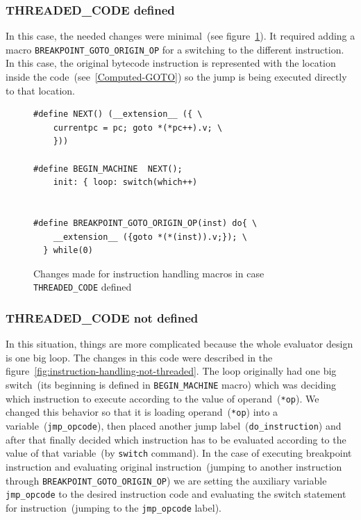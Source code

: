 \documentclass[thesis=M,english]{FITthesis}[2018/10/20]
\newcommand{\code}[1]{\texttt{#1}}
\begin{document}
{\subsubsection{THREADED{\_}CODE defined}

In this case, the needed changes were minimal~(see figure~\ref{fig:instruction-handling-threaded}). It required adding a macro \code{BREAKPOINT{\_}GOTO{\_}ORIGIN{\_}OP} for a switching to the different instruction. In this case, the original bytecode instruction is represented with the location inside the code~(see~\ref{Computed-GOTO}) so the jump is being executed directly to that location.

\begin{figure}[H]
\begin{lstlisting}
#define NEXT() (__extension__ ({ \
    currentpc = pc; goto *(*pc++).v; \
    }))

#define BEGIN_MACHINE  NEXT();
    init: { loop: switch(which++)


#define BREAKPOINT_GOTO_ORIGIN_OP(inst) do{ \
    __extension__ ({goto *(*(inst)).v;}); \
  } while(0)
\end{lstlisting}
	\caption{Changes made for instruction handling macros in case \code{THREADED{\_}CODE} defined}\label{fig:instruction-handling-threaded}
\end{figure}

\subsubsection{THREADED{\_}CODE not defined}

In this situation, things are more complicated because the whole evaluator design is one big loop. The changes in this code were described in the figure~\ref{fig:instruction-handling-not-threaded}. The loop originally had one big switch~(its beginning is defined in \code{BEGIN{\_}MACHINE} macro) which was deciding which instruction to execute according to the value of operand~(\code{*op}). We changed this behavior so that it is loading operand~(\code{*op}) into a variable~(\code{jmp{\_}opcode}), then placed another jump label~(\code{do{\_}instruction}) and after that finally decided which instruction has to be evaluated according to the value of that variable~(by \code{switch} command). In the case of executing breakpoint instruction and evaluating original instruction~(jumping to another instruction through \code{BREAKPOINT{\_}GOTO{\_}ORIGIN{\_}OP}) we are setting the auxiliary variable \code{jmp{\_}opcode} to the desired instruction code and evaluating the switch statement for instruction~(jumping to the \code{jmp{\_}opcode} label).

}
\end{document}

